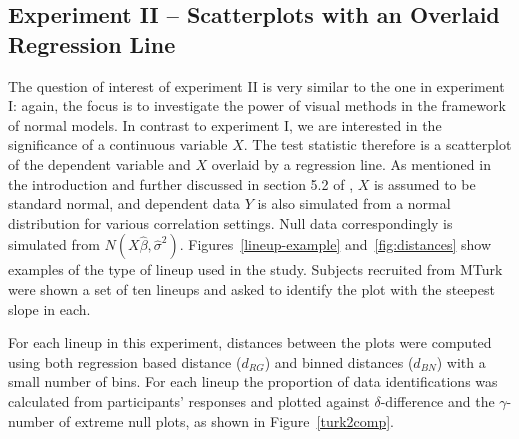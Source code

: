 \documentclass[12pt]{article}\usepackage[]{graphicx}\usepackage[]{color}
\begin{document}
\subsection{Experiment II -- Scatterplots with an Overlaid Regression Line}\label{sec:turk2}
The question of interest of experiment II is very similar to the one in experiment I: again, the focus is to investigate the power of visual methods in the framework of normal models. In contrast to experiment I, we are interested in the significance of a continuous variable $X$. The test statistic therefore is a scatterplot of the dependent variable and $X$ overlaid by a regression line. As mentioned in the introduction and further discussed in section 5.2 of \citet{majumder:2011}, $X$ is assumed to be standard normal, and dependent data $Y$ is also simulated from a normal distribution for various correlation settings. Null data correspondingly is simulated from $N(X\widehat{\beta}, \widehat{\sigma}^2)$.  
Figures~\ref{lineup-example} and~\ref{fig:distances} show examples of the type of  lineup used in the study.  Subjects recruited from MTurk  were shown a set of ten lineups  and asked to identify the plot with the steepest slope in each. 

For each lineup in this experiment,  distances between the plots were computed using both  regression based distance  ($d_{RG}$) and  binned distances ($d_{BN}$) with a small number of bins. For each lineup the proportion of data identifications was calculated from participants' responses and plotted against $\delta$-difference and the $\gamma$-number of extreme null plots, as shown in Figure~\ref{turk2comp}.
\end{document}
